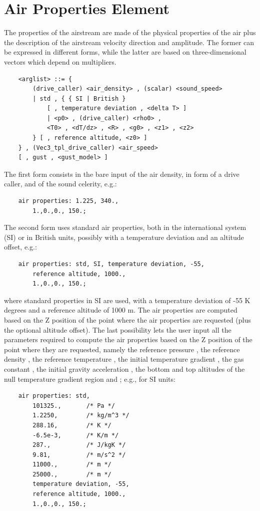 \section{Air Properties Element}
The properties of the airstream are made of the physical properties
of the air plus the description of the airstream velocity direction
and amplitude.
The former can be expressed in different forms, while the latter
are based on three-dimensional vectors which depend on multipliers.
\begin{verbatim}
    <arglist> ::= {
        (drive_caller) <air_density> , (scalar) <sound_speed> 
        | std , { { SI | British }
            [ , temperature deviation , <delta T> ]
            | <p0> , (drive_caller) <rho0> ,
            <T0> , <dT/dz> , <R> , <g0> , <z1> , <z2>
        } [ , reference altitude, <z0> ]
    } , (Vec3_tpl_drive_caller) <air_speed>
    [ , gust , <gust_model> ]
\end{verbatim}
The first form consists in the bare input of the air density,
in form of a drive caller, and of the sound celerity, e.g.:
\begin{verbatim}
    air properties: 1.225, 340.,
        1.,0.,0., 150.;
\end{verbatim}
The second form uses standard air properties, both in the
international system (SI) or in British units, possibly
with a temperature deviation and an altitude offset, e.g.:
\begin{verbatim}
    air properties: std, SI, temperature deviation, -55,
        reference altitude, 1000.,
        1.,0.,0., 150.;
\end{verbatim}
where standard properties in SI are used, with a temperature
deviation of -55 K degrees and a reference altitude of 1000 m.
The air properties are computed based on the Z position of the
point where the air properties are requested (plus the optional
altitude offset).
The last possibility lets the user input all the parameters
required to compute the air properties based on the Z position
of the point where they are requested, namely the reference
pressure , the reference density ,
the reference temperature , the initial temperature
gradient , the gas constant , the
initial gravity acceleration , the bottom and top
altitudes of the null temperature gradient region  and
; e.g., for SI units:
\begin{verbatim}
    air properties: std,
        101325.,       /* Pa */
        1.2250,        /* kg/m^3 */
        288.16,        /* K */
        -6.5e-3,       /* K/m */
        287.,          /* J/kgK */
        9.81,          /* m/s^2 */
        11000.,        /* m */
        25000.,        /* m */
        temperature deviation, -55,
        reference altitude, 1000.,
        1.,0.,0., 150.;
\end{verbatim}
